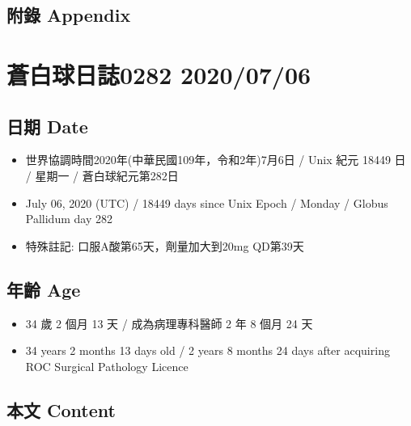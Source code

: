\documentclass[a5paper, 11pt
]{book}
\providecommand{\tightlist}{%
  \setlength{\itemsep}{0pt}\setlength{\parskip}{0pt}}
\begin{document}
\hypertarget{ux9644ux9304-appendix-30}{%
\subsection{附錄 Appendix}\label{ux9644ux9304-appendix-30}}

\hypertarget{ux84bcux767dux7403ux65e5ux8a8c0282-20200706}{%
\section{蒼白球日誌0282
2020/07/06}\label{ux84bcux767dux7403ux65e5ux8a8c0282-20200706}}

\hypertarget{ux65e5ux671f-date-31}{%
\subsection{日期 Date}\label{ux65e5ux671f-date-31}}

\begin{itemize}
\tightlist
\item
  世界協調時間2020年(中華民國109年，令和2年)7月6日 / Unix 紀元 18449 日
  / 星期一 / 蒼白球紀元第282日
\item
  July 06, 2020 (UTC) / 18449 days since Unix Epoch / Monday / Globus
  Pallidum day 282
\item
  特殊註記: 口服A酸第65天，劑量加大到20mg QD第39天
\end{itemize}

\hypertarget{ux5e74ux9f61-age-31}{%
\subsection{年齡 Age}\label{ux5e74ux9f61-age-31}}

\begin{itemize}
\tightlist
\item
  34 歲 2 個月 13 天 / 成為病理專科醫師 2 年 8 個月 24 天
\item
  34 years 2 months 13 days old / 2 years 8 months 24 days after
  acquiring ROC Surgical Pathology Licence
\end{itemize}

\hypertarget{ux672cux6587-content-31}{%
\subsection{本文 Content}\label{ux672cux6587-content-31}}
\end{document}
